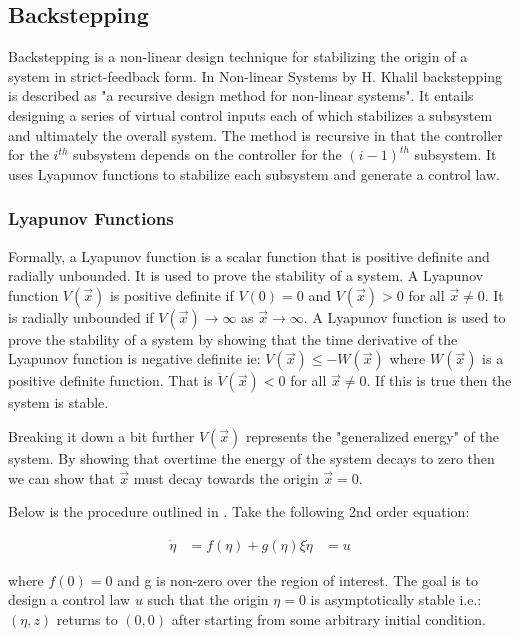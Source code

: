 \subsection{Backstepping}
Backstepping is a non-linear design technique for stabilizing the origin of a system in strict-feedback form.
In Non-linear Systems by H. Khalil \cite{khalilNonlinearSystems2002} backstepping is described as "a recursive design method for non-linear systems". It entails designing a series of virtual control inputs each of which stabilizes a subsystem and ultimately the overall system. The method is recursive in that the controller for the $i^{th}$ subsystem depends on the controller for the $(i-1)^{th}$ subsystem. It uses Lyapunov functions to stabilize each subsystem and generate a control law. 

\subsubsection{Lyapunov Functions}
Formally, a Lyapunov function is a scalar function that is positive definite and radially unbounded. It is used to prove the stability of a system. A Lyapunov function $V(\vec{x})$ is positive definite if $V(0)=0$ and $V(\vec{x})>0$ for all $\vec{x}\neq0$. It is radially unbounded if $V(\vec{x})\rightarrow\infty$ as $\vec{x}\rightarrow\infty$. A Lyapunov function is used to prove the stability of a system by showing that the time derivative of the Lyapunov function is negative definite ie: $V(\vec{x}) \leq -W(\vec{x})$ where $W(\vec{x})$ is a positive definite function. That is $\dot{V}(\vec{x})<0$ for all $\vec{x}\neq0$. If this is true then the system is stable. 

Breaking it down a bit further $V(\vec{x})$ represents the "generalized energy" of the system. By showing that overtime the energy of the system decays to zero then we can show that $\vec{x}$ must decay towards the origin $\vec{x}=0$.

\par 
Below is the procedure outlined in \cite{khalilNonlinearSystems2002}. Take the following 2nd order equation:

\begin{align}
    \dot{\eta} &= f(\eta) + g(\eta)\xi \label{eq:1}
    \dot{\eta} &= u
\end{align}

where $f(0)=0$ and g is non-zero over the region of interest.
The goal is to design a control law $u$ such that the origin $\eta=0$ is asymptotically stable i.e.: $(\eta, z)$ returns to $(0,0)$ after starting from some arbitrary initial condition.

